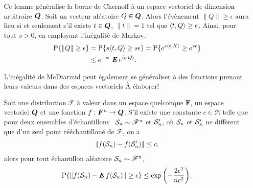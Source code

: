 \begin{lemme}
  \label{b:lem:chernoff}
  Ce lemme généralise la borne de Chernoff à un espace vectoriel de dimension arbitraire
  $\Q$. Soit un vecteur aléatoire $Q \in \Q$. Alors l'évènement $\|Q\| \geq \epsilon$ aura lieu si et
  seulement s'il existe $t \in \Q$, $\|t\|=1$ tel que $\inp{t,Q} \geq \epsilon$. Ainsi, pour tout
  $s>0$, en employant l'inégalité de Markov, 
  \begin{align}
    \pp\{\|Q\| \geq \epsilon\} &= \pp\{s\inp{t,Q} \geq s\epsilon\} = \pp\{e^{s\inp{t,X}} \geq e^{s\epsilon}\}\\
                     &\leq e^{-s\epsilon}\E e^{\inp{t,Q}}.
  \end{align}
\end{lemme}

\begin{lemme}
  \label{b:lem:mcdiarmid}
  L'inégalité de McDiarmid peut également se généraliser à des fonctions prenant leurs
  valeurs dans des espaces vectoriels À élaborer!

  Soit une distribution $\mathscr{F}$ à valeur dans un espace quelconque $\bm F$, un
  espace vectoriel $\Q$ et une fonction $f:\bm F^n\to \Q$. S'il existe une constante
  $c\in\Re$ telle que pour deux ensembles d'échantillons \iid\ $\S_n \sim \mathscr{F}^n$ et
  $\S'_n$, où $\S_n$ et $\S'_n$ ne diffèrent que d'un seul point rééchantilloné de
  $\mathscr{F}$, on a
  \begin{equation}
    \|f(\S_n) - f(\S'_n)\| \leq c,
  \end{equation}
  alors pour tout échantillon aléatoire $\S_n\sim\mathscr{F}^n$, 
  \begin{equation}
    \pp\{\|f(\S_n) - \E f(\S_n)\| \geq \epsilon\} \leq \exp\left(-\frac{2\epsilon^2}{nc^2}\right).
  \end{equation}
\end{lemme}


